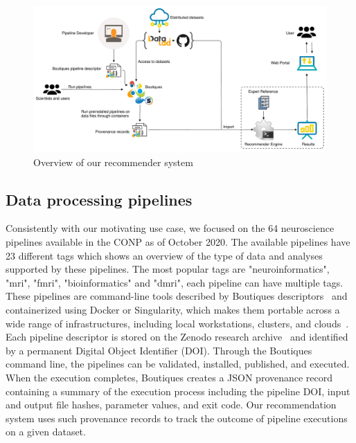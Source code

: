 \documentclass[conference]{IEEEtran}
\begin{document}
\begin{figure}[ht]
  \centering
  \includegraphics[width=\textwidth]{figures/Methodology.pdf}%
  \caption{Overview of our recommender system  }
  \label{fig:method}
  \end{figure}  


\subsection{Data processing pipelines} 
Consistently with our motivating use case, we focused on the 64
neuroscience pipelines available in the CONP as of October
2020. 
The available pipelines have 23 different tags which shows an overview of the type of data
and analyses supported by these pipelines. The most popular tags are "neuroinformatics", "mri", "fmri", "bioinformatics" and "dmri", each pipeline can have multiple tags. These pipelines are command-line
tools described by Boutiques descriptors~\cite{glatard2018boutiques} and
containerized using Docker or Singularity, which makes them portable across
a wide range of infrastructures, including local workstations, clusters,
and clouds~\cite{kiar2019serverless}. Each pipeline descriptor is stored on
the Zenodo research archive~\cite{zenodo} and identified by a permanent Digital Object
Identifier (DOI). Through the Boutiques command line, the pipelines can be
validated, installed, published, and executed. When the execution
completes, Boutiques creates a JSON provenance record containing a summary
of the execution process including the pipeline DOI, input and output file
hashes, parameter values, and exit code. Our recommendation system uses
such provenance records to track the outcome of pipeline executions on a
given dataset.
\end{document}

